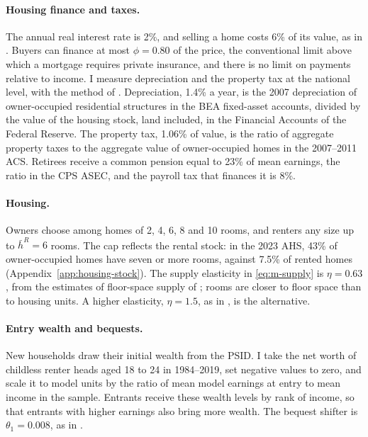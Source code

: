 \paragraph{Housing finance and taxes.}
The annual real interest rate is 2\%, and selling a home costs 6\% of its
value, as in \citet{greaneyDynamicUrbanEconomics2025}. Buyers can finance at
most $\phi=0.80$ of the price, the conventional limit above which a mortgage
requires private insurance, and there is no limit on payments relative to
income. I measure depreciation and the property tax at the national level,
with the method of \citet{greaneyDynamicUrbanEconomics2025}. Depreciation,
1.4\% a year, is the 2007 depreciation of owner-occupied residential
structures in the BEA fixed-asset accounts, divided by the value of the
housing stock, land included, in the Financial Accounts of the Federal
Reserve. The property tax, 1.06\% of value, is the ratio of aggregate
property taxes to the aggregate value of owner-occupied homes in the
2007--2011 ACS. Retirees receive a common pension equal to 23\% of mean
earnings, the ratio in the CPS ASEC, and the payroll tax that finances it is
8\%.

\paragraph{Housing.}
Owners choose among homes of 2, 4, 6, 8 and 10 rooms, and renters any size
up to $\bar h^R=6$ rooms. The cap reflects the rental stock: in the 2023 AHS,
43\% of owner-occupied homes have seven or more rooms, against 7.5\% of
rented homes (Appendix~\ref{app:housing-stock}). The supply elasticity in
\eqref{eq:m-supply} is $\eta=0.63$, from the estimates of floor-space supply of
\citet{baum-snowMicrogeographyHousingSupply2024}; rooms are closer to floor
space than to housing units. A higher elasticity, $\eta=1.5$, as in
\citet{kaplanMitmanViolanteHousing2020}, is the alternative.

\paragraph{Entry wealth and bequests.}
New households draw their initial wealth from the PSID. I take the net worth
of childless renter heads aged 18 to 24 in 1984--2019, set negative values to
zero, and scale it to model units by the ratio of mean model earnings at
entry to mean income in the sample. Entrants receive these wealth levels by
rank of income, so that entrants with higher earnings also bring more
wealth. The bequest shifter is $\theta_1=0.008$, as in
\citet{greaneyDynamicUrbanEconomics2025}.

